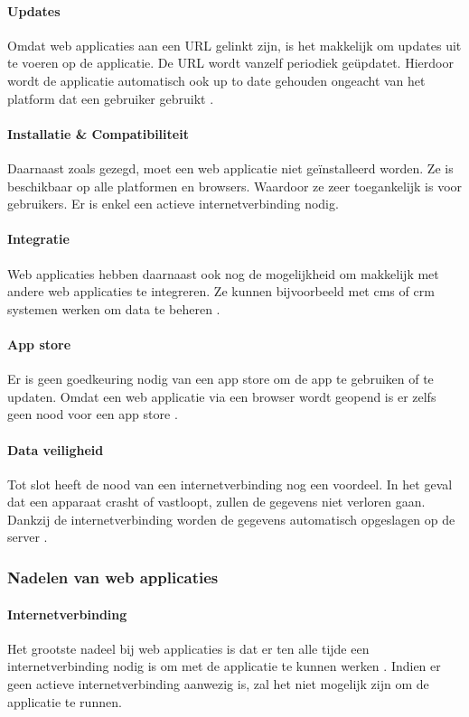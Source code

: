 \paragraph{Updates}
Omdat web applicaties aan een URL gelinkt zijn, is het makkelijk om updates uit te voeren op de applicatie. 
De URL wordt vanzelf periodiek geüpdatet. Hierdoor wordt de applicatie automatisch ook up to date gehouden 
ongeacht van het platform dat een gebruiker gebruikt \autocite{Varsha2023}.

\paragraph{Installatie \& Compatibiliteit}
Daarnaast zoals gezegd, moet een web applicatie niet geïnstalleerd worden. Ze is beschikbaar op alle 
platformen en browsers. Waardoor ze zeer toegankelijk is voor gebruikers. Er is enkel een actieve 
internetverbinding nodig.

\paragraph{Integratie}
Web applicaties hebben daarnaast ook nog de mogelijkheid om makkelijk met andere web applicaties te integreren. 
Ze kunnen bijvoorbeeld met \acrshort{cms} of \acrshort{crm} systemen werken om data te beheren \autocite{Nehra2023}.

\paragraph{App store}
Er is geen goedkeuring nodig van een app store om de app te gebruiken of te updaten. Omdat een web applicatie 
via een browser wordt geopend is er zelfs geen nood voor een app store \autocite{Varsha2023}.

\paragraph{Data veiligheid}
Tot slot heeft de nood van een internetverbinding nog een voordeel. In het geval dat een apparaat
crasht of vastloopt, zullen de gegevens niet verloren gaan. Dankzij de internetverbinding worden de
gegevens automatisch opgeslagen op de server \autocite{Nehra2023}.

\subsubsection{Nadelen van web applicaties}
\paragraph{Internetverbinding}
Het grootste nadeel bij web applicaties is dat er ten alle tijde een internetverbinding nodig is om met 
de applicatie te kunnen werken \autocite{Varsha2023}. Indien er geen actieve internetverbinding aanwezig is, 
zal het niet mogelijk zijn om de applicatie te runnen.

